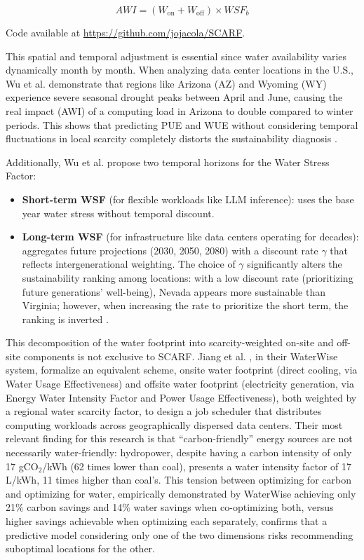 \documentclass[conference]{IEEEtran}
\begin{document}
\begin{equation}
AWI = (W_{\text{on}} + W_{\text{off}}) \times WSF_b
\end{equation}

Code available at \url{https://github.com/jojacola/SCARF}.

This spatial and temporal adjustment is essential since water availability varies dynamically month by month. When analyzing data center locations in the U.S., Wu et al. \cite{Wu2025} demonstrate that regions like Arizona (AZ) and Wyoming (WY) experience severe seasonal drought peaks between April and June, causing the real impact (AWI) of a computing load in Arizona to double compared to winter periods. This shows that predicting PUE and WUE without considering temporal fluctuations in local scarcity completely distorts the sustainability diagnosis \cite{Wu2025}.

Additionally, Wu et al. \cite{Wu2025} propose two temporal horizons for the Water Stress Factor:

\begin{itemize}
\item \textbf{Short-term WSF} (for flexible workloads like LLM inference): uses the base year water stress without temporal discount.
\item \textbf{Long-term WSF} (for infrastructure like data centers operating for decades): aggregates future projections (2030, 2050, 2080) with a discount rate $\gamma$ that reflects intergenerational weighting. The choice of $\gamma$ significantly alters the sustainability ranking among locations: with a low discount rate (prioritizing future generations' well-being), Nevada appears more sustainable than Virginia; however, when increasing the rate to prioritize the short term, the ranking is inverted \cite{Wu2025}.
\end{itemize}

This decomposition of the water footprint into scarcity-weighted on-site and off-site components is not exclusive to SCARF. Jiang et al. \cite{Jiang2025WaterWise}, in their WaterWise system, formalize an equivalent scheme, onsite water footprint (direct cooling, via Water Usage Effectiveness) and offsite water footprint (electricity generation, via Energy Water Intensity Factor and Power Usage Effectiveness), both weighted by a regional water scarcity factor, to design a job scheduler that distributes computing workloads across geographically dispersed data centers. Their most relevant finding for this research is that ``carbon-friendly'' energy sources are not necessarily water-friendly: hydropower, despite having a carbon intensity of only 17 gCO$_2$/kWh (62 times lower than coal), presents a water intensity factor of 17 L/kWh, 11 times higher than coal's. This tension between optimizing for carbon and optimizing for water, empirically demonstrated by WaterWise achieving only 21\% carbon savings and 14\% water savings when co-optimizing both, versus higher savings achievable when optimizing each separately, confirms that a predictive model considering only one of the two dimensions risks recommending suboptimal locations for the other.
\end{document}
